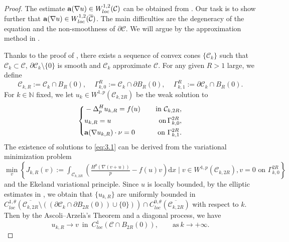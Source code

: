 \documentclass[12pt]{amsart}
\theoremstyle{definition}
\theoremstyle{remark}
\theoremstyle{conclusion}
\theoremstyle{conjecture}
\numberwithin{equation}{section}
\begin{document}
\begin{proof}
   The estimate ${\bf{a}}(\nabla u)\in W^{1,2}_{loc}(\mathcal{C})$ can be obtained from \cite[Theorem 1.1]{ACF}. Our task is to show further that ${\bf{a}}(\nabla u)\in W^{1,2}_{loc}(\overline{\mathcal{C}})$. The main difficulties are the degeneracy of the equation and the non-smoothness of $\partial\mathcal{C}$. We will argue by the approximation method in \cite{AKM,CFR, CM}.

   Thanks to the proof of \cite[Theorem 1.3]{CRS}, there exists a sequence of convex cones $\{\mathcal{C}_k\}$ such that $\mathcal{C}_k\subset\mathcal{C}$, $\partial\mathcal{C}_k\setminus\{0\}$ is smooth and $\mathcal{C}_k$ approximate $\mathcal{C}$. For any given $R>1$ large, we define
 \begin{equation*}
    \mathcal{C}_{k,R}:=\mathcal{C}_k\cap B_R(0),\quad\, \Gamma_{k,0}^R:=\mathcal{C}_k\cap \partial B_R(0),\quad\, \Gamma_{k,1}^R:=\partial\mathcal{C}_k\cap  B_R(0).
 \end{equation*}
    For $k\in\mathbb{N}$ fixed, we let $u_k\in W^{1,p}(\mathcal{C}_{k,2R})$ be the weak solution to
    \begin{equation}\label{eq:3.1}
        \left\{
            \begin{aligned}
            & -\Delta ^{H}_{p}u_{k,R}=f(u)\quad \, &{\rm{in}}\ \mathcal{C}_{k,2R},\\
            &u_{k,R}=u \quad \, &{\rm{on}}\, \Gamma_{k,0}^{2R},\\
            &{\bf{a}}(\nabla u_{k,R})\cdot \nu =0\quad\, &{\rm{on}}\ \Gamma_{k,1}^{2R}.
            \end{aligned}
            \right.
    \end{equation}
    The existence of solutions to \eqref{eq:3.1} can be derived from the variational minimization problem $\min\limits_{v}\left\{J_{k,R}(v):=\int_{\mathcal{C}_{k,2R}}\left(\frac{H^{p}(\nabla(v+u))}{p}-f(u)v\right)\mathrm{d} x \mid v\in W^{1,p}(\mathcal{C}_{k,2R}), v=0 \,\, \text{on}\,\, \Gamma_{k,0}^{2R}\right\}$ and the Ekeland variational principle.
    Since $u$ is locally bounded, by the elliptic estimates in \cite{L,S,T}, we obtain
    that $\{u_{k,R}\}$ are uniformly bounded in $C^{1,\theta}_{loc}(\overline{\mathcal{C}_{k,2R}}\setminus((\partial\mathcal{C}_k\cap\partial B_{2R}(0))\cup\{0\}))\cap C^{0,\theta}_{loc}(\overline{\mathcal{C}_{k,2R}})$ with respect to $k$. Then
    by the Ascoli--Arzel$\acute{\text{a}} $'s Theorem and a diagonal process, we have
    \begin{equation}\label{lim}
      u_{k,R}\rightarrow v\,\,\, \text{in}\,\,\, C^{1}_{loc}(\mathcal{C}\cap B_{2R}(0)),\qquad \text{as}\ k\rightarrow+\infty.
    \end{equation}


\end{proof}
\end{document}
